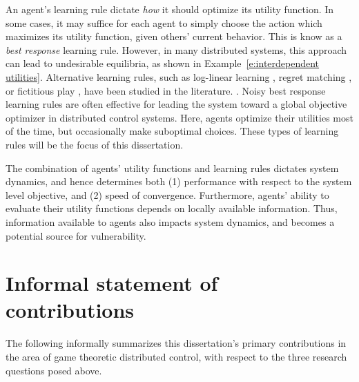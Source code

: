 An agent's learning rule dictate {\it how} it should optimize its utility function. In some cases, it may suffice for each agent to simply choose the action which maximizes its utility function, given others' current behavior. This is know as a {\it best response} learning rule. However, in many distributed systems, this approach can lead to undesirable equilibria, as shown in Example~\ref{e:interdependent utilities}. Alternative learning rules, such as log-linear learning \cite{Blume1993}, regret matching \cite{blah}, or fictitious play \cite{blah}, have been studied in the literature. . Noisy best response learning rules are often effective for leading the system toward a global objective optimizer in distributed control systems. Here, agents optimize their utilities most of the time, but occasionally make suboptimal choices. These types of learning rules will be the focus of this dissertation.

The combination of agents' utility functions and learning rules dictates system dynamics, and hence determines both (1) performance with respect to the system level objective, and (2) speed of convergence. Furthermore, agents' ability to evaluate their utility functions depends on locally available information. Thus, information available to agents also impacts system dynamics, and becomes a potential source for vulnerability.




\section{Informal statement of contributions}






The following informally summarizes this dissertation's primary contributions in the area of game theoretic distributed control, with respect to the three research questions posed above.

